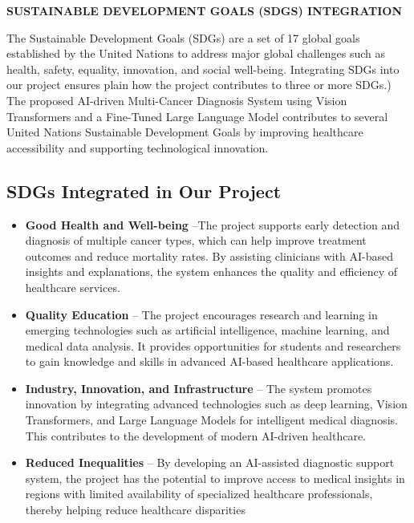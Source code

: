 \begin{center}
    \textbf{\large SUSTAINABLE DEVELOPMENT GOALS (SDGS) INTEGRATION} 
\end{center}

The Sustainable Development Goals (SDGs) are a set of 17 global goals established by the United Nations to address major global challenges such as health, safety, equality, innovation, and social well-being. Integrating SDGs into our project ensures plain how the project contributes to three or more SDGs.) 
The proposed AI-driven Multi-Cancer Diagnosis System using Vision Transformers and a Fine-Tuned  
Large Language Model contributes to several United Nations Sustainable Development Goals by improving  
healthcare accessibility and supporting technological innovation.

\subsection*{SDGs Integrated in Our Project}
\begin{itemize}[leftmargin=2.5cm]
    \item[\textbf{SDG 3:}] \textbf{Good Health and Well-being} --The project supports early detection and diagnosis of  
multiple cancer types, which can help improve treatment outcomes and reduce mortality rates. By  
assisting clinicians with AI-based insights and explanations, the system enhances the quality and  
efficiency of healthcare services. 
 \item[\textbf{SDG 4:}] \textbf{Quality Education} --  The project encourages research and learning in emerging  
technologies such as artificial intelligence, machine learning, and medical data analysis. It provides  
opportunities for students and researchers to gain knowledge and skills in advanced AI-based  
healthcare applications. 
    \item[\textbf{SDG 9:}] \textbf{Industry, Innovation, and Infrastructure} -- The system promotes innovation by  
integrating advanced technologies such as deep learning, Vision Transformers, and Large Language  
Models for intelligent medical diagnosis. This contributes to the development of modern AI-driven  
healthcare. 
    \item[\textbf{SDG 10:}] \textbf{Reduced Inequalities} -- By developing an AI-assisted diagnostic support system, the  
project has the potential to improve access to medical insights in regions with limited availability of 
specialized healthcare professionals, thereby helping reduce healthcare disparities
\end{itemize}

